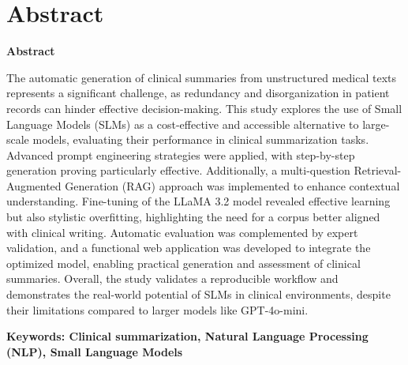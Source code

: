 \documentclass[../main.tex]{subfiles}
\begin{document}
\makeatletter
\renewenvironment{abstract}{%
    \if@twocolumn
      \section*{Abstract \\}%
    \else %
    \begin{flushright}
        {\filleft\Huge\bfseries\fontsize{48pt}{12}\selectfont Abstract\vspace{\z@}}%
        \end{flushright}
      \quotation
    \fi}
    {\if@twocolumn\else\endquotation\fi}
\makeatother
\begin{abstract}

The automatic generation of clinical summaries from unstructured medical texts represents a significant challenge, as redundancy and disorganization in patient records can hinder effective decision-making. This study explores the use of Small Language Models (SLMs) as a cost-effective and accessible alternative to large-scale models, evaluating their performance in clinical summarization tasks. Advanced prompt engineering strategies were applied, with step-by-step generation proving particularly effective. Additionally, a multi-question Retrieval-Augmented Generation (RAG) approach was implemented to enhance contextual understanding. Fine-tuning of the LLaMA 3.2 model revealed effective learning but also stylistic overfitting, highlighting the need for a corpus better aligned with clinical writing. Automatic evaluation was complemented by expert validation, and a functional web application was developed to integrate the optimized model, enabling practical generation and assessment of clinical summaries. Overall, the study validates a reproducible workflow and demonstrates the real-world potential of SLMs in clinical environments, despite their limitations compared to larger models like GPT-4o-mini.

\bfseries{\large{Keywords:}} Clinical summarization, Natural Language Processing (NLP), Small Language Models

\end{abstract}
\end{document}
